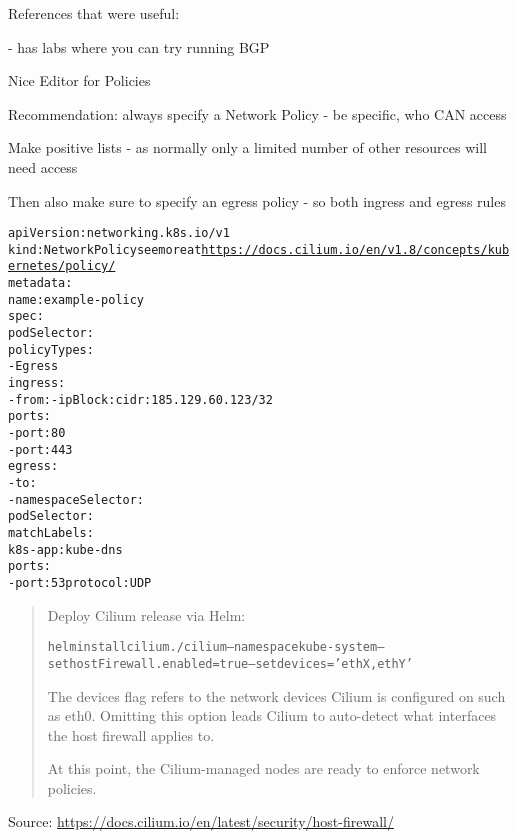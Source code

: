 \documentclass[Screen16to9,17pt]{foils}
\begin{document}
References that were useful:
\begin{list2}
\item {}
\item {}
\item {} - has labs where you can try running BGP
\end{list2}




\begin{list2}
\item Nice Editor for Policies 
\item Recommendation: always specify a Network Policy - be specific, who CAN access
\item Make positive lists - as normally only a limited number of other resources will need access
\item Then also make sure to specify an egress policy - so both ingress and egress rules
\end{list2}


\begin{alltt}\scriptsize
apiVersion: networking.k8s.io/v1
kind: NetworkPolicy    see more at \url{https://docs.cilium.io/en/v1.8/concepts/kubernetes/policy/}
metadata:
  name: example-policy
spec:
  podSelector: {}
  policyTypes:
    - Egress
  ingress:
    - from: - ipBlock: cidr: 185.129.60.123/32
      ports:
        - port: 80
        - port: 443
  egress:
    - to:
        - namespaceSelector: {}
          podSelector:
            matchLabels:
              k8s-app: kube-dns
      ports:
        - port: 53          protocol: UDP
\end{alltt}




\begin{quote}
Deploy Cilium release via Helm:

\begin{alltt}\footnotesize
helm install cilium ./cilium   --namespace kube-system  --set hostFirewall.enabled=true    --set devices='{ethX,ethY}'
\end{alltt}
The devices flag refers to the network devices Cilium is configured on such as eth0. Omitting this option leads Cilium to auto-detect what interfaces the host firewall applies to.

At this point, the Cilium-managed nodes are ready to enforce network policies.

\end{quote}
Source: \url{https://docs.cilium.io/en/latest/security/host-firewall/}
\end{document}
